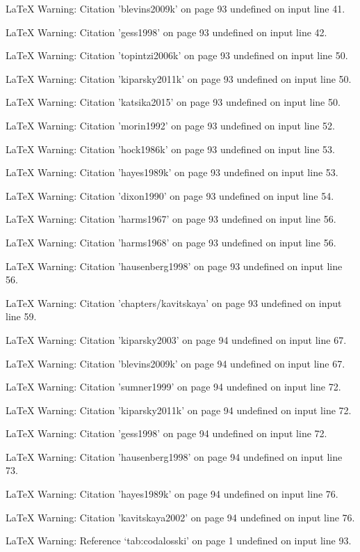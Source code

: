 LaTeX Warning: Citation 'blevins2009k' on page 93 undefined on input line 41.


LaTeX Warning: Citation 'gess1998' on page 93 undefined on input line 42.


LaTeX Warning: Citation 'topintzi2006k' on page 93 undefined on input line 50.


LaTeX Warning: Citation 'kiparsky2011k' on page 93 undefined on input line 50.


LaTeX Warning: Citation 'katsika2015' on page 93 undefined on input line 50.


LaTeX Warning: Citation 'morin1992' on page 93 undefined on input line 52.


LaTeX Warning: Citation 'hock1986k' on page 93 undefined on input line 53.


LaTeX Warning: Citation 'hayes1989k' on page 93 undefined on input line 53.


LaTeX Warning: Citation 'dixon1990' on page 93 undefined on input line 54.


LaTeX Warning: Citation 'harms1967' on page 93 undefined on input line 56.


LaTeX Warning: Citation 'harms1968' on page 93 undefined on input line 56.


LaTeX Warning: Citation 'hausenberg1998' on page 93 undefined on input line 56.


LaTeX Warning: Citation 'chapters/kavitskaya' on page 93 undefined on input line 59.


LaTeX Warning: Citation 'kiparsky2003' on page 94 undefined on input line 67.


LaTeX Warning: Citation 'blevins2009k' on page 94 undefined on input line 67.


LaTeX Warning: Citation 'sumner1999' on page 94 undefined on input line 72.


LaTeX Warning: Citation 'kiparsky2011k' on page 94 undefined on input line 72.


LaTeX Warning: Citation 'gess1998' on page 94 undefined on input line 72.


LaTeX Warning: Citation 'hausenberg1998' on page 94 undefined on input line 73.


LaTeX Warning: Citation 'hayes1989k' on page 94 undefined on input line 76.


LaTeX Warning: Citation 'kavitskaya2002' on page 94 undefined on input line 76.


LaTeX Warning: Reference `tab:codalosski' on page 1 undefined on input line 93.


